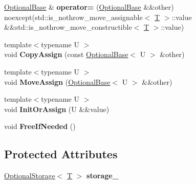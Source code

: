 \begin{DoxyCompactItemize}
\item 
\mbox{\label{classv8_1_1base_1_1internal_1_1OptionalBase_a99e1eae551a7bbd3f84c0118422bdf48}} 
\mbox{\hyperlink{classv8_1_1base_1_1internal_1_1OptionalBase}{Optional\+Base}} \& {\bfseries operator=} (\mbox{\hyperlink{classv8_1_1base_1_1internal_1_1OptionalBase}{Optional\+Base}} \&\&other) noexcept(std\+::is\+\_\+nothrow\+\_\+move\+\_\+assignable$<$ \mbox{\hyperlink{classv8_1_1internal_1_1torque_1_1T}{T}} $>$\+::value \&\&std\+::is\+\_\+nothrow\+\_\+move\+\_\+constructible$<$ \mbox{\hyperlink{classv8_1_1internal_1_1torque_1_1T}{T}} $>$\+::value)
\item 
\mbox{\label{classv8_1_1base_1_1internal_1_1OptionalBase_abf9a2775f7d84efb1a8a1394adbeb0c4}} 
{\footnotesize template$<$typename U $>$ }\\void {\bfseries Copy\+Assign} (const \mbox{\hyperlink{classv8_1_1base_1_1internal_1_1OptionalBase}{Optional\+Base}}$<$ U $>$ \&other)
\item 
\mbox{\label{classv8_1_1base_1_1internal_1_1OptionalBase_af35c2e21d42370747d5d7f15046a5c82}} 
{\footnotesize template$<$typename U $>$ }\\void {\bfseries Move\+Assign} (\mbox{\hyperlink{classv8_1_1base_1_1internal_1_1OptionalBase}{Optional\+Base}}$<$ U $>$ \&\&other)
\item 
\mbox{\label{classv8_1_1base_1_1internal_1_1OptionalBase_a39a93ad094c74555c01137efb1d738c9}} 
{\footnotesize template$<$typename U $>$ }\\void {\bfseries Init\+Or\+Assign} (U \&\&value)
\item 
\mbox{\label{classv8_1_1base_1_1internal_1_1OptionalBase_a12e5d4399d88cd8f69871ac3f8f987c4}} 
void {\bfseries Free\+If\+Needed} ()
\end{DoxyCompactItemize}
\subsection*{Protected Attributes}
\begin{DoxyCompactItemize}
\item 
\mbox{\label{classv8_1_1base_1_1internal_1_1OptionalBase_a528e15d1a7a93e6731b30ece16d60469}} 
\mbox{\hyperlink{structv8_1_1base_1_1internal_1_1OptionalStorage}{Optional\+Storage}}$<$ \mbox{\hyperlink{classv8_1_1internal_1_1torque_1_1T}{T}} $>$ {\bfseries storage\+\_\+}
\end{DoxyCompactItemize}
